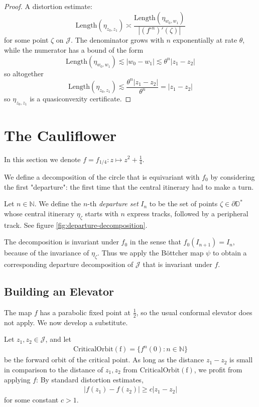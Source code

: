 \begin{proof}
A distortion estimate: 
\[
\mathrm{Length}\left(\eta_{z_{0},z_{1}}\right)\asymp\frac{\mathrm{Length}\left(\eta_{w_0,w_1}\right)}{\left|\left(f^{\circ n}\right)'\left(\zeta\right)\right|}
\]
 for some point $\zeta$ on $\mathcal{J}$. The denominator grows
with $n$ exponentially at rate $\theta$, while the numerator has
a bound of the form 
\[
\mathrm{Length}\left(\eta_{w_0,w_1}\right)\lesssim\left|w_0-w_1\right|\lesssim\theta^{n}\left|z_{1}-z_{2}\right|
\]
 so altogether 
\[
\mathrm{Length}\left(\eta_{z_{0},z_{1}}\right)\lesssim\frac{\theta^{n}\left|z_{1}-z_{2}\right|}{\theta^{n}}=\left|z_{1}-z_{2}\right|
\]
 so $\eta_{z_{0},z_{1}}$ is a quasiconvexity certificate.
\end{proof}

\section{The Cauliflower}
In this section we denote  $f=f_{1/4}: z\mapsto z^2+ \frac 14$.

We define a decomposition of the circle that is equivariant with $f_0$ by considering the first "departure": the first time that the central itinerary had to make a turn.



\begin{definition}
Let $n \in \mathbb N$. We define the $n$-th \emph{departure set} $I_n$ to be the set of points $\zeta \in \partial \mathbb D^*$ whose central itinerary $\eta_{\zeta}$ starts with $n$ express tracks, followed by a peripheral track.
See figure \ref{fig:departure-decomposition}.
\end{definition}



The decomposition is invariant under $f_0$ in the sense that $f_0(I_{n+1})=I_n$, because of the invariance of $\eta _\zeta$.
Thus we apply the Böttcher map $\psi$ to obtain a corresponding departure decomposition of $\mathcal J$ that is invariant under $f$.


\subsection{Building an Elevator}
The map $f$ has a parabolic fixed point at $\frac 12$, so the usual conformal elevator does not apply. We now develop a substitute.

Let $z_1,z_2 \in \mathcal J$, and let
\begin{align*}
	\mathrm{CriticalOrbit(f)}=\{f^n(0): n \in \mathbb N\}
\end{align*} be the forward orbit of the critical point.
As long as the distance $z_1-z_2$ is small in comparison to the distance of $z_1,z_2$ from $\mathrm{CriticalOrbit(f)}$, we profit from applying $f$: By standard distortion estimates, 
\begin{align*}
|f(z_1)-f(z_2)|\geq c |z_1-z_2|
\end{align*}
for some constant $c>1$.

